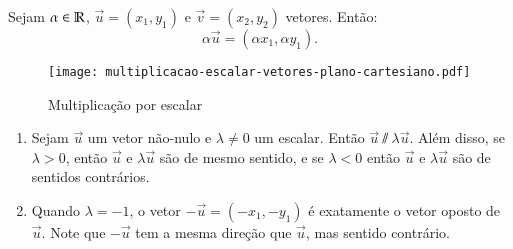 \begin{definicao}
  Sejam $\alpha \in \mathbb{R}$, $\vec{u} = (x_1, y_1)$ e $\vec{v} = (x_2, y_2)$ vetores. Ent\~ao:
  \[
  	\alpha \vec{u} = (\alpha x_1, \alpha y_1).
  \]
\end{definicao}

\begin{figure}[!h]
  \centering
  \caption{Multiplica\c{c}\~ao por escalar}
  \texttt{[image: multiplicacao-escalar-vetores-plano-cartesiano.pdf]}


\end{figure}

\begin{observacao}
	\begin{enumerate}
		\item Sejam $\vec{u}$ um vetor n\~ao-nulo e $\lambda \ne 0$ um escalar. Ent\~ao $\vec{u} \varparallel\lambda\vec{u}$. Al\'em disso, se $\lambda > 0$, ent\~ao $\vec{u}$ e $\lambda\vec{u}$ s\~ao de mesmo sentido, e se $\lambda < 0$ ent\~ao $\vec{u}$ e $\lambda\vec{u}$ s\~ao de sentidos contr\'arios.
		\item Quando $\lambda = -1$, o vetor $-\vec{u} = (-x_1,-y_1)$  \'e exatamente o vetor oposto de $\vec{u}$. Note que $-\vec{u}$ tem a mesma dire\c{c}\~ao que $\vec{u}$, mas sentido contr\'ario.
	\end{enumerate}
	
\end{observacao}


